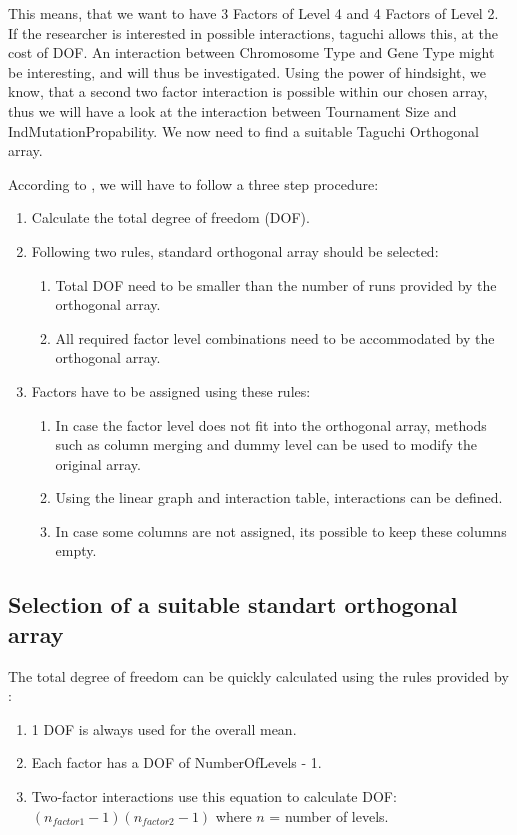 This means, that we want to have 3 Factors of Level 4 and 4 Factors of Level 2. If the researcher is interested in possible interactions, taguchi allows this, at the cost of DOF.
An interaction between Chromosome Type and Gene Type might be interesting, and will thus be investigated. Using the power of hindsight, we know, that a second two factor interaction is possible within our chosen array, thus we will have a look at the interaction between Tournament Size and IndMutationPropability.
We now need to find a suitable Taguchi Orthogonal array.

According to \cite{yang_design_2009}, we will have to follow a three step procedure:

\begin{enumerate}
	\item Calculate the total degree of freedom (DOF). 
	\item Following two rules, standard orthogonal array should be selected:
	\begin{enumerate}
			\item Total DOF need to be smaller than the number of runs provided by the orthogonal array.
			\item All required factor level combinations need to be accommodated by the orthogonal array.
	\end{enumerate}

	\item Factors have to be assigned using these rules: 
	\begin{enumerate}
		\item In case the factor level does not fit into the orthogonal array, methods such as column merging and dummy level can be used to modify the original array.
		\item Using the linear graph and interaction table, interactions can be defined. 
		\item In case some columns are not assigned, its possible to keep these columns empty.
	\end{enumerate}
\end{enumerate}


\subsection{Selection of a suitable standart orthogonal array}
The total degree of freedom can be quickly calculated using the rules provided by \cite{yang_design_2009}:

\begin{enumerate}
	\item 1 DOF is always used for the overall mean. 
	\item Each factor has a DOF of NumberOfLevels - 1.
	\item Two-factor interactions use this equation to calculate DOF: $(n_{factor1} - 1)(n_{factor2} - 1)$ where $n$ = number of levels.
\end{enumerate}


